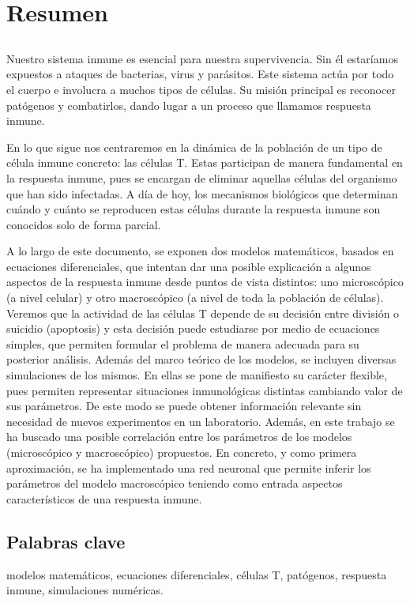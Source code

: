 \chapter*{Resumen}


\section*{}

Nuestro sistema inmune es esencial para nuestra supervivencia. Sin él estaríamos expuestos a ataques de bacterias, virus y parásitos. Este sistema actúa por todo el cuerpo e involucra a muchos tipos de células. Su misión principal es reconocer patógenos y combatirlos, dando lugar a un proceso que llamamos respuesta inmune. 

En lo que sigue nos centraremos en la dinámica de la población de un tipo de célula inmune concreto: las células T. Estas participan de manera fundamental en la respuesta inmune, pues se encargan de eliminar aquellas células del organismo que han sido infectadas. A día de hoy, los mecanismos biológicos que determinan cuándo y cuánto se reproducen estas células durante la respuesta inmune son conocidos solo de forma parcial. 

A lo largo de este documento, se exponen dos modelos matemáticos, basados en ecuaciones diferenciales, que intentan dar una posible explicación a algunos aspectos de la respuesta inmune desde puntos de vista distintos: uno microscópico (a nivel celular) y otro macroscópico (a nivel de toda la población de células). Veremos que la actividad de las células T depende de su decisión entre división o suicidio (apoptosis) y esta decisión puede estudiarse por medio de ecuaciones simples, que permiten formular el problema de manera adecuada para su posterior análisis. Además del marco teórico de los modelos, se incluyen diversas simulaciones de los mismos. En ellas se pone de manifiesto su carácter flexible, pues permiten representar situaciones inmunológicas distintas cambiando valor de sus parámetros. De este modo se puede obtener información relevante sin necesidad de nuevos experimentos en un laboratorio. Además, en este trabajo se ha buscado una posible correlación entre los parámetros de los modelos (microscópico y macroscópico) propuestos. En concreto, y como primera aproximación, se ha implementado una red neuronal que permite inferir los parámetros del modelo macroscópico teniendo como entrada aspectos característicos de una respuesta inmune.



\section*{Palabras clave}
   

\noindent modelos matemáticos, ecuaciones diferenciales, células T, patógenos, respuesta inmune, simulaciones numéricas.

   



